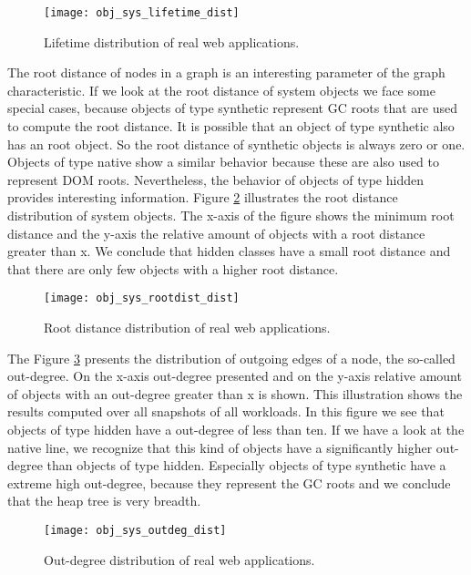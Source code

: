 \begin{figure}
	\centering
	\texttt{[image: obj\_sys\_lifetime\_dist]}
	\caption{Lifetime distribution of real web applications.}
	\label{fig:obj_sys_lieftiem_dist}
\end{figure}

The root distance of nodes in a graph is an interesting parameter of the graph characteristic. If we look at the root distance of system objects we face some special cases, because objects of type synthetic represent GC roots that are used to compute the root distance. It is possible that an object of type synthetic also has an root object. So the root distance of synthetic objects is always zero or one. Objects of type native show a similar behavior because these are also used to represent DOM roots. Nevertheless, the behavior of objects of type hidden provides interesting information. Figure \ref{fig:obj_sys_rootdist_dist} illustrates the root distance distribution of system objects. The x-axis of the figure shows the minimum root distance and the y-axis the relative amount of objects with a root distance greater than x. We conclude that hidden classes have a small root distance and that there are only few objects with a higher root distance.

\begin{figure}
	\centering
	\texttt{[image: obj\_sys\_rootdist\_dist]}
	\caption{Root distance distribution of real web applications.}
	\label{fig:obj_sys_rootdist_dist}
\end{figure}

The Figure \ref{fig:obj_sys_outdeg_dist} presents the distribution of outgoing
edges of a node, the so-called out-degree. On the x-axis out-degree presented
and on the y-axis relative amount of objects with an out-degree greater than x
is shown. This illustration shows the results computed over all snapshots of
all workloads. In this figure we see that objects of type hidden have a
out-degree of less than ten. If we have a look at the native line, we recognize
that this kind of objects have a significantly higher out-degree than objects
of type hidden. Especially objects of type synthetic have a extreme high
out-degree, because they represent the GC roots and we conclude that the heap
tree is very breadth.


\begin{figure}
	\centering
	\texttt{[image: obj\_sys\_outdeg\_dist]}
	\caption{Out-degree distribution of real web applications.}
	\label{fig:obj_sys_outdeg_dist}
\end{figure}

% 
